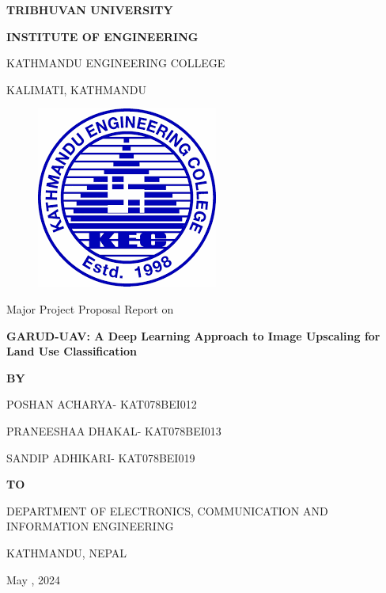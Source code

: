 \begin{titlepage}
    \thispagestyle{empty}
    \begin{center}
    
    \vspace*{\fill} %
    \vspace*{-1cm}
    {\Large \textbf{TRIBHUVAN UNIVERSITY
}\par}
{\large \textbf{INSTITUTE OF ENGINEERING
}\par}
\vspace{12pt}
KATHMANDU ENGINEERING COLLEGE

KALIMATI, KATHMANDU
\vspace{24pt}

\begin{figure}[ht]
    \centering
    \includegraphics[scale=0.45]{images/kec.png}
\end{figure}
\vspace{24pt}
{Major Project Proposal Report on\par}
\vspace{6pt}
{\textbf{GARUD-UAV: A Deep Learning Approach to Image Upscaling for Land Use Classification}\par}

\vspace{18pt}
{\textbf{BY}\par}
\vspace{10pt}
    
{POSHAN ACHARYA- KAT078BEI012\par}
{PRANEESHAA DHAKAL- KAT078BEI013\par}
{SANDIP ADHIKARI- KAT078BEI019\par}

\vspace{28pt}
{\textbf{TO}\par}
\vspace{10pt}
{DEPARTMENT OF ELECTRONICS, COMMUNICATION AND INFORMATION ENGINEERING\par}
{KATHMANDU, NEPAL\par}
\vspace{14pt}
{May , 2024\par}

    \vspace*{\fill}

    \end{center}
\end{titlepage}